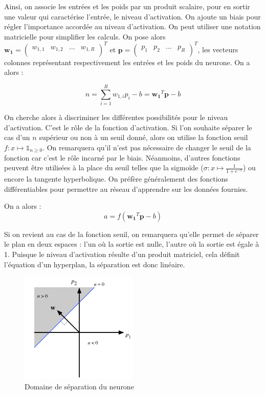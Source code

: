 Ainsi, on associe les entrées et les poids par un produit scalaire, pour en sortir une valeur qui caractérise l'entrée, le niveau d'activation.
On ajoute un biais pour régler l'importance accordée au niveau d'activation. On peut utiliser une notation matricielle pour simplifier les calculs.
On pose alors $\mathbf{w_1} = 
\begin{pmatrix}
  w_{1,1} & w_{1,2} & \ldots & w_{1,R}\\
\end{pmatrix}^T $ 
et
$ \mathbf{p} = 
\begin{pmatrix}
 p_1 & p_2 & \ldots & p_R \\
\end{pmatrix}^T $, 
les vecteurs colonnes représentant respectivement les entrées et les poids du neurone. On a alors :

\begin{equation} 
n = \sum_{i=1}^{R} w_{1,i} p_i - b = \mathbf{w_1}^T \mathbf{p} - b
\end{equation}

On cherche alors à discriminer les différentes possibilités pour le niveau d'activation. C'est le rôle de la fonction d'activation. Si l'on souhaite séparer
le cas d'un $n$ supérieur ou non à un seuil donné, alors on utilise la fonction seuil $ f : x \mapsto \mathds{1}_{n \geq 0} $. On remarquera qu'il n'est 
pas nécessaire de changer le seuil de la fonction car c'est le rôle incarné par le biais. Néanmoins, d'autres fonctions peuvent être utilisées à la place
du seuil telles que la sigmoïde ($\sigma : x \mapsto \frac{1}{1+e^{-x}}$) ou encore la tangente hyperbolique. 
On préfère généralement des fonctions différentiables pour permettre au réseau d'apprendre sur les données fournies.

On a alors : 
\begin{equation}
 a = f\left(\mathbf{w_1}^T \mathbf{p} - b\right)
\end{equation}

Si on revient au cas de la fonction seuil, on remarquera qu'elle permet de séparer le plan en deux espaces : l'un où la sortie est nulle, l'autre où
la sortie est égale à 1. Puisque le niveau d'activation résulte d'un produit matriciel, cela définit l'équation d'un hyperplan, la séparation
est donc linéaire.

\begin{figure}[h]
 \centering
 \includegraphics[width=0.5\textwidth]{img/separation_lineaire_du_plan.png}
 \caption{Domaine de séparation du neurone}
\end{figure}

